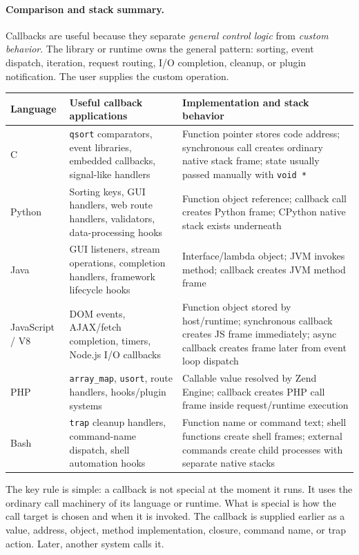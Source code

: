 \paragraph{Comparison and stack summary.}

Callbacks are useful because they separate \emph{general control logic} from \emph{custom behavior}. The library or runtime owns the general pattern: sorting, event dispatch, iteration, request routing, I/O completion, cleanup, or plugin notification. The user supplies the custom operation.

\begin{center}
\begin{tabular}{|p{}|p{}|p{}|}
\hline
\textbf{Language} & \textbf{Useful callback applications} & \textbf{Implementation and stack behavior} \\
\hline
C & \texttt{qsort} comparators, event libraries, embedded callbacks, signal-like handlers & Function pointer stores code address; synchronous call creates ordinary native stack frame; state usually passed manually with \texttt{void *} \\
\hline
Python & Sorting keys, GUI handlers, web route handlers, validators, data-processing hooks & Function object reference; callback call creates Python frame; CPython native stack exists underneath \\
\hline
Java & GUI listeners, stream operations, completion handlers, framework lifecycle hooks & Interface/lambda object; JVM invokes method; callback creates JVM method frame \\
\hline
JavaScript / V8 & DOM events, AJAX/fetch completion, timers, Node.js I/O callbacks & Function object stored by host/runtime; synchronous callback creates JS frame immediately; async callback creates frame later from event loop dispatch \\
\hline
PHP & \texttt{array\_map}, \texttt{usort}, route handlers, hooks/plugin systems & Callable value resolved by Zend Engine; callback creates PHP call frame inside request/runtime execution \\
\hline
Bash & \texttt{trap} cleanup handlers, command-name dispatch, shell automation hooks & Function name or command text; shell functions create shell frames; external commands create child processes with separate native stacks \\
\hline
\end{tabular}
\end{center}

The key rule is simple: a callback is not special at the moment it runs. It uses the ordinary call machinery of its language or runtime. What is special is how the call target is chosen and when it is invoked. The callback is supplied earlier as a value, address, object, method implementation, closure, command name, or trap action. Later, another system calls it.

